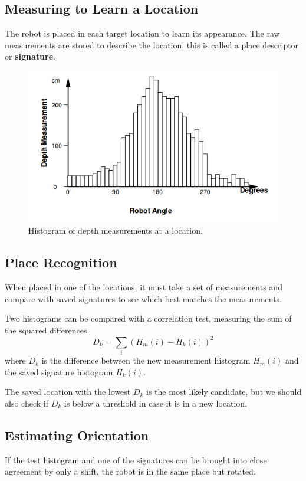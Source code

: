 \documentclass[11pt]{article}
\begin{document}
\subsection{Measuring to Learn a Location}
The robot is placed in each target location to learn its appearance.
The raw measurements are stored to describe the location, this is called a place descriptor or \textbf{signature}.

\begin{figure}[h]
  \caption{Histogram of depth measurements at a location.}
  \includegraphics[scale=0.4]{locationdepth}
  \centering
\end{figure}

\subsection{Place Recognition}
When placed in one of the locations, it must take a set of measurements and compare with saved signatures to see which best matches the measurements.

Two histograms can be compared with a correlation test, measuring the sum of the squared differences.
\[
  D_k = \sum_i (H_m(i) - H_k(i))^2
\]
where $D_k$ is the difference between the new measurement histogram $H_m(i)$ and the saved signature histogram $H_k(i)$.

The saved location with the lowest $D_k$ is the most likely candidate, but we should also check if $D_k$ is below a threshold in case it is in a new location.

\subsection{Estimating Orientation}
If the test histogram and one of the signatures can be brought into close agreement by only a shift, the robot is in the same place but rotated.
\end{document}
